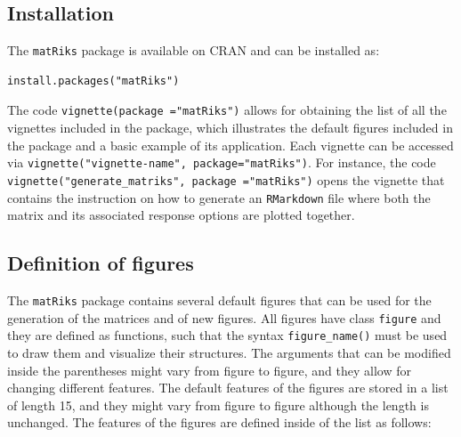 \subsection{Installation}\label{installation}

The \texttt{matRiks} package is available on CRAN and can be installed as:

\begin{verbatim}
install.packages("matRiks")
\end{verbatim}

The code \texttt{vignette(package\ ="matRiks")} allows for obtaining the list of all the vignettes included in the package, which illustrates the default figures included in the package and a basic example of its application.
Each vignette can be accessed via \texttt{vignette("vignette-name",\ package="matRiks")}.
For instance, the code \texttt{vignette("generate\_matriks",\ package\ ="matRiks")} opens the vignette that contains the instruction on how to generate an \texttt{RMarkdown} file where both the matrix and its associated response options are plotted together.

\subsection{Definition of figures}\label{definition-of-figures}

The \texttt{matRiks} package contains several default figures that can be used for the generation of the matrices and of new figures.
All figures have class \texttt{figure} and they are defined as functions, such that the syntax \texttt{figure\_name()} must be used to draw them and visualize their structures.
The arguments that can be modified inside the parentheses might vary from figure to figure, and they allow for changing different features.
The default features of the figures are stored in a list of length 15, and they might vary from figure to figure although the length is unchanged.
The features of the figures are defined inside of the list as follows:

